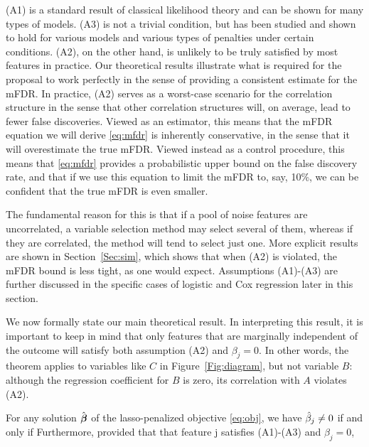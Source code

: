 (A1) is a standard result of classical likelihood theory and can be shown for many types of models.  (A3) is not a trivial condition, but has been studied and shown to hold for various models and various types of penalties under certain conditions.  (A2), on the other hand, is unlikely to be truly satisfied by most features in practice.
Our theoretical results illustrate what is required for the proposal to work perfectly in the sense of providing a consistent estimate for the mFDR.
In practice, (A2) serves as a worst-case scenario for the correlation structure in the sense that other correlation structures will, on average, lead to fewer false discoveries.
Viewed as an estimator, this means that the mFDR equation we will derive \eqref{eq:mfdr} is inherently conservative, in the sense that it will overestimate the true mFDR.
Viewed instead as a control procedure, this means that \eqref{eq:mfdr} provides a probabilistic upper bound on the false discovery rate, and that if we use this equation to limit the mFDR to, say, 10\%, we can be confident that the true mFDR is even smaller.

The fundamental reason for this is that if a pool of noise features are uncorrelated, a variable selection method may select several of them, whereas if they are correlated, the method will tend to select just one.  More explicit results are shown in Section~\ref{Sec:sim}, which shows that when (A2) is violated, the mFDR bound is less tight, as one would expect.
Assumptions (A1)-(A3) are further discussed in the specific cases of logistic and Cox regression later in this section.

We now formally state our main theoretical result.  In interpreting this result, it is important to keep in mind that only features that are marginally independent of the outcome will satisfy both assumption (A2) and $\beta_j=0$.
In other words, the theorem applies to variables like $C$ in Figure~\ref{Fig:diagram}, but not variable $B$: although the regression coefficient for $B$ is zero, its correlation with $A$ violates (A2).

\begin{theorem}
  \label{Thm:main}
  For any solution $\hat{\boldsymbol{\beta}}$ of the lasso-penalized objective \eqref{eq:obj}, we have $\hat{\beta}_j \neq 0$ if and only if
  Furthermore, provided that that feature j satisfies (A1)-(A3) and $\beta_j=0$,
\end{theorem}

